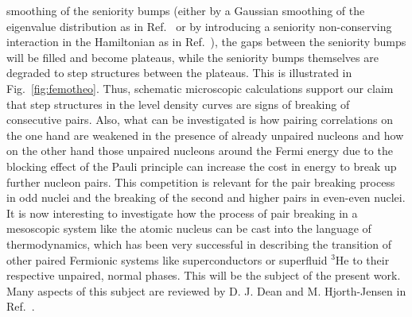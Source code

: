 \documentclass[sort&compress,final,numberedheadings]{aipproc}
\begin{document}
smoothing of the seniority bumps (either by a Gaussian smoothing of the 
eigenvalue distribution as in Ref.\ \cite{GB00} or by introducing a seniority 
non-conserving interaction in the Hamiltonian as in Ref.\ \cite{SA03}), the 
gaps between the seniority bumps will be filled and become plateaus, while the 
seniority bumps themselves are degraded to step structures between the 
plateaus. This is illustrated in Fig.\ \ref{fig:femotheo}. Thus, schematic 
microscopic calculations support our claim that step structures in the level 
density curves are signs of breaking of consecutive pairs. Also, what can be 
investigated is how pairing correlations on the one hand are weakened in the 
presence of already unpaired nucleons and how on the other hand those unpaired 
nucleons around the Fermi energy due to the blocking effect of the Pauli 
principle can increase the cost in energy to break up further nucleon pairs. 
This competition is relevant for the pair breaking process in odd nuclei and 
the breaking of the second and higher pairs in even-even nuclei. It is now 
interesting to investigate how the process of pair breaking in a mesoscopic 
system like the atomic nucleus can be cast into the language of thermodynamics,
which has been very successful in describing the transition of other paired 
Fermionic systems like superconductors or superfluid $^3$He to their respective
unpaired, normal phases. This will be the subject of the present work. Many 
aspects of this subject are reviewed by D. J. Dean and M. Hjorth-Jensen in 
Ref.\ \cite{DJ03}.
\end{document}
